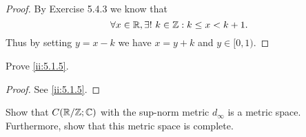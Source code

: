 \begin{proof}
  By Exercise 5.4.3 we know that
  \[
    \forall x \in \mathbb{R}, \exists!\ k \in \mathbb{Z} : k \leq x < k + 1.
  \]
  Thus by setting \(y = x - k\) we have \(x = y + k\) and \(y \in [0, 1)\).
\end{proof}

\begin{ex}\label{ii:ex:5.1.2}
  Prove \cref{ii:5.1.5}.
\end{ex}

\begin{proof}
  See \cref{ii:5.1.5}.
\end{proof}

\begin{ex}\label{ii:ex:5.1.3}
  Show that \(C(\mathbb{R} / \mathbb{Z} ; \mathbb{C})\) with the sup-norm metric \(d_\infty\) is a metric space.
  Furthermore, show that this metric space is complete.
\end{ex}

